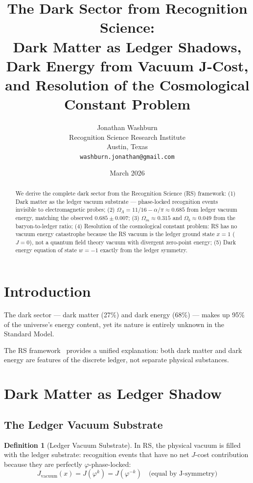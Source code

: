 \documentclass[12pt,a4paper]{article}
\title{The Dark Sector from Recognition Science:\\
Dark Matter as Ledger Shadows, Dark Energy from Vacuum J-Cost,\\
and Resolution of the Cosmological Constant Problem}
\author{Jonathan Washburn\\
Recognition Science Research Institute\\
Austin, Texas\\
\texttt{washburn.jonathan@gmail.com}}
\date{March 2026}
\theoremstyle{definition}
\newtheorem{definition}[theorem]{Definition}
\theoremstyle{remark}
\begin{document}
\maketitle

\begin{abstract}
We derive the complete dark sector from the Recognition Science (RS) framework: 
(1) Dark matter as the ledger vacuum substrate — phase-locked recognition events 
invisible to electromagnetic probes; (2) $\Omega_\Lambda = 11/16 - \alpha/\pi \approx 0.685$ 
from ledger vacuum energy, matching the observed $0.685 \pm 0.007$; 
(3) $\Omega_m \approx 0.315$ and $\Omega_b \approx 0.049$ from the baryon-to-ledger ratio; 
(4) Resolution of the cosmological constant problem: RS has no vacuum energy catastrophe 
because the RS vacuum is the ledger ground state $x = 1$ ($J = 0$), not a quantum field 
theory vacuum with divergent zero-point energy; (5) Dark energy equation of state 
$w = -1$ exactly from the ledger symmetry.
\end{abstract}

\section{Introduction}

The dark sector — dark matter (27\%) and dark energy (68\%) — makes up 95\% of the 
universe's energy content, yet its nature is entirely unknown in the Standard Model.

The RS framework~\cite{RS_Axioms} provides a unified explanation: both dark matter and
dark energy are features of the discrete ledger, not separate physical substances.

\section{Dark Matter as Ledger Shadow}

\subsection{The Ledger Vacuum Substrate}

\begin{definition}[Ledger Vacuum Substrate]
In RS, the physical vacuum is filled with the ledger substrate: 
recognition events that have no net $J$-cost contribution because they are perfectly 
$\varphi$-phase-locked:
\begin{equation}
J_\mathrm{vacuum}(x) = J(\varphi^k) = J(\varphi^{-k}) \quad \text{(equal by J-symmetry)}
\end{equation}
\end{definition}
\end{document}
